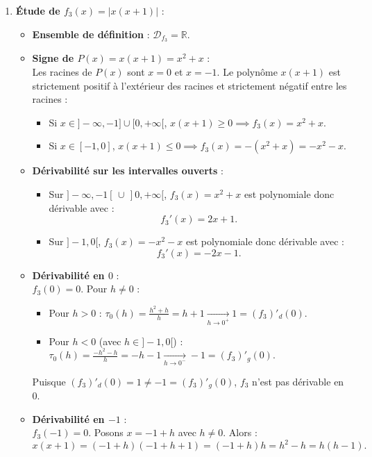 \documentclass[11pt,a4paper]{article}
\newcommand{\R}{\mathbb{R}}
\begin{document}
\begin{correctionbox}
\begin{enumerate}[label=\textbf{\arabic*.}]
    \item \textbf{Étude de $f_3(x) = |x(x+1)|$} :
    \begin{itemize}
        \item \textbf{Ensemble de définition} : $\mathcal{D}_{f_3} = \R$.
        \item \textbf{Signe de $P(x) = x(x+1) = x^2 + x$} :\\
        Les racines de $P(x)$ sont $x = 0$ et $x = -1$.
        Le polynôme $x(x+1)$ est strictement positif à l'extérieur des racines et strictement négatif entre les racines :
        \begin{itemize}
            \item Si $x \in ]-\infty, -1] \cup [0, +\infty[$, $x(x+1) \ge 0 \implies f_3(x) = x^2 + x$.
            \item Si $x \in [-1, 0]$, $x(x+1) \le 0 \implies f_3(x) = -(x^2 + x) = -x^2 - x$.
        \end{itemize}
        \item \textbf{Dérivabilité sur les intervalles ouverts} :
        \begin{itemize}
            \item Sur $]-\infty, -1[\, \cup\, ]0, +\infty[$, $f_3(x) = x^2 + x$ est polynomiale donc dérivable avec :
            \[
            f_3'(x) = 2x + 1.
            \]
            \item Sur $]-1, 0[$, $f_3(x) = -x^2 - x$ est polynomiale donc dérivable avec :
            \[
            f_3'(x) = -2x - 1.
            \]
        \end{itemize}
        \item \textbf{Dérivabilité en $0$} :\\
        $f_3(0) = 0$. Pour $h \neq 0$ :
        \begin{itemize}
            \item Pour $h > 0$ : $\tau_0(h) = \frac{h^2 + h}{h} = h + 1 \xrightarrow[h \to 0^+]{} 1 = (f_3)'_d(0)$.
            \item Pour $h < 0$ (avec $h \in ]-1, 0[$) : $\tau_0(h) = \frac{-h^2 - h}{h} = -h - 1 \xrightarrow[h \to 0^-]{} -1 = (f_3)'_g(0)$.
        \end{itemize}
        Puisque $(f_3)'_d(0) = 1 \neq -1 = (f_3)'_g(0)$, $f_3$ n'est pas dérivable en $0$.
        \item \textbf{Dérivabilité en $-1$} :\\
        $f_3(-1) = 0$. Posons $x = -1 + h$ avec $h \neq 0$. Alors :
        \[
        x(x+1) = (-1+h)(-1+h+1) = (-1+h)h = h^2 - h = h(h-1).
\]
\end{itemize}
\end{enumerate}
\end{correctionbox}
\end{document}
